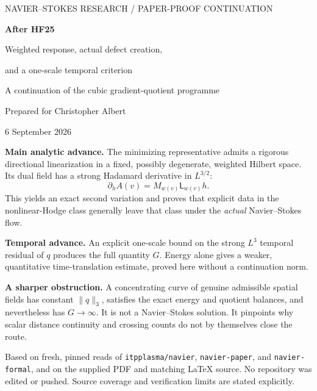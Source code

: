 \documentclass[11pt,a4paper]{article}
\theoremstyle{definition}\newtheorem{definition}[theorem]{Definition}
\theoremstyle{remark}\newtheorem{remark}[theorem]{Remark}
\newcommand{\LP}{\mathsf L}
\newcommand{\norm}[1]{\lVert #1\rVert}
\newcommand{\repo}[1]{{\small\texttt{#1}}}
\numberwithin{equation}{section}
\begin{document}
\begin{titlepage}\thispagestyle{empty}
\vspace*{10mm}
{\sffamily\small\color{teal!65!black} NAVIER--STOKES RESEARCH / PAPER-PROOF CONTINUATION\par}
\vspace{9mm}
{\LARGE\bfseries After HF25\par}
\vspace{4mm}
{\Large Weighted response, actual defect creation,\par and a one-scale temporal criterion\par}
\vspace{8mm}
{\large A continuation of the cubic gradient-quotient programme\par}
\vspace{6mm}
Prepared for Christopher Albert\par
6 September 2026\par
\vspace{9mm}
\noindent\textbf{Main analytic advance.} The minimizing representative admits a rigorous directional linearization in a fixed, possibly degenerate, weighted Hilbert space. Its dual field has a strong Hadamard derivative in $L^{3/2}$:
\[
 \partial_h A(v)=M_{w(v)}\LP_{w(v)}h.
\]
This yields an exact second variation and proves that explicit data in the nonlinear-Hodge class generally leave that class under the \emph{actual} Navier--Stokes flow.

\noindent\textbf{Temporal advance.} An explicit one-scale bound on the strong $L^3$ temporal residual of $q$ produces the full quantity $G$. Energy alone gives a weaker, quantitative time-translation estimate, proved here without a continuation norm.

\noindent\textbf{A sharper obstruction.} A concentrating curve of genuine admissible spatial fields has constant $\norm q_3$, satisfies the exact energy and quotient balances, and nevertheless has $G\to\infty$. It is not a Navier--Stokes solution. It pinpoints why scalar distance continuity and crossing counts do not by themselves close the route.
\par\vspace{6mm}
\noindent{}\par
\vfill
{\small Based on fresh, pinned reads of \repo{itpplasma/navier}, \repo{navier-paper}, and \repo{navier-formal}, and on the supplied PDF and matching LaTeX source. No repository was edited or pushed. Source coverage and verification limits are stated explicitly.}
\end{titlepage}
{\footnotesize\setlength{\parskip}{0pt}\tableofcontents}
\newpage
\end{document}
